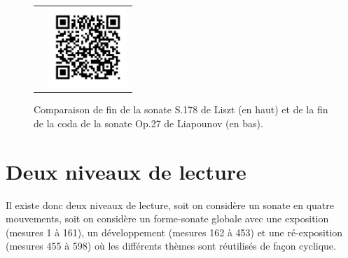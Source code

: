 \begin{figure}[!p]
\begin{bigcenter}
\begin{tabular}{lr}
      &
      \includegraphics[width=3cm, keepaspectratio]{sonate-qr.png}
    \end{tabular}
  \end{bigcenter}
  \caption{\label{sonate-fin}Comparaison de fin de la sonate S.178 de Liszt (en haut) et de la fin de la coda de la sonate Op.27 de Liapounov (en bas).}
\end{figure}

\section{Deux niveaux de lecture}

Il existe donc deux niveaux de lecture, soit on considère un sonate en quatre mouvements, soit on considère un forme-sonate globale avec une exposition (mesures 1 à 161), un développement (mesures 162 à 453) et une ré-exposition (mesures 455 à 598) où les différents thèmes sont réutilisés de façon cyclique.

